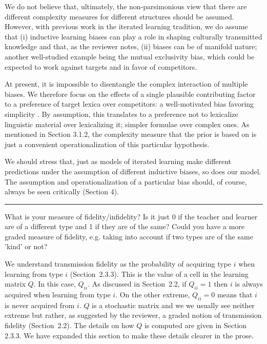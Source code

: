 \documentclass[12pt,a4paper]{article}
\begin{document}
We do not believe that, ultimately, the non-parsimonious view that there are different complexity measures for different structures should be assumed. However, with previous work in the iterated learning tradition, we do assume that (i) inductive learning biases can play a role in shaping culturally transmitted knowledge and that, as the reviewer notes, (ii) biases can be of manifold nature; another well-studied example being the mutual exclusivity bias, which could be expected to work against targets and in favor of competitors.

At present, it is impossible to disentangle the complex interaction of multiple biases. We therefore focus on the effects of a single plausible contributing factor to a preference of target lexica over competitors: a well-motivated bias favoring simplicity \citep{feldman:2000,chater+vitanyi:2003, piantadosi+etal:2012a,kirby+etal:2015,piantadosi+etal:underreview}. By assumption, this translates to a preference not to lexicalize linguistic material over lexicalizing it; simpler formulae over complex ones. As mentioned in Section 3.1.2, the complexity measure that the prior is based on is just a convenient operationalization of this particular hypothesis. 

We should stress that, just as models of iterated learning make different predictions under the assumption of different inductive biases, so does our model. The assumption and operationalization of a particular bias should, of course, always be seen critically (Section 4). 

%

\vspace{0.5cm}
\noindent\rule{\textwidth}{1pt}

\begin{mdframed}[backgroundcolor=gray!25,linecolor=gray!25,frametitle= Reviewer \thereviewerCounter~comment \thereviewerCommentCounter \hfill ~~({\it transmission fidelity})]
%
What is your measure of fidelity/infidelity? Is it just 0 if the teacher and learner are of a different type and 1 if they are of the same? Could you have a more graded measure of fidelity, e.g. taking into account if two types are of the same 'kind' or not? 
\end{mdframed}
%
We understand transmission fidelity as the probability of acquiring type $i$ when learning from type $i$ (Section~2.3.3). This is the value of a cell in the learning matrix $Q$. In this case, $Q_{ii}$. As discussed in Section~2.2, if $Q_{ii} = 1$ then $i$ is always acquired when learning from type $i$. On the other extreme, $Q_{ii} = 0$ means that $i$ is never acquired from $i$. $Q$ is a stochastic matrix and we we usually see neither extreme but rather, as suggested by the reviewer, a graded notion of transmission fidelity (Section~2.2). The details on how $Q$ is computed are given in Section 2.3.3. We have expanded this section to make these details clearer in the prose.
%
\end{document}
